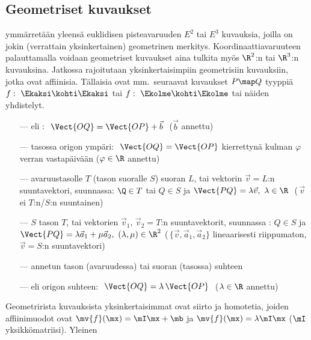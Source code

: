 \subsection{Geometriset kuvaukset}

 ymmärretään yleensä euklidisen pisteavaruuden $E^2$ tai $E^3$
kuvauksia, joilla on jokin (verrattain yksinkertainen) geometrinen merkitys. 
Koordinaattiavaruuteen palauttamalla voidaan geometriset kuvaukset aina tulkita myös $\R^2$:n 
tai $\R^3$:n kuvauksina. Jatkossa rajoitutaan yksinkertaisimpiin geometrisiin kuvauksiin,
jotka ovat affiinisia. Tällaisia ovat mm.\ seuraavat kuvaukset $P \map Q$ tyyppiä 
$f:\ \Ekaksi\kohti\Ekaksi$ tai $f:\ \Ekolme\kohti\Ekolme$ tai näiden yhdistelyt.
  
  
\begin{itemize}
\item[---]  eli : $\ \Vect{OQ} = \Vect{OP} + \vec{b}\ $ 
           ($\vec{b}$ annettu)
\item[---]  tasossa origon ympäri: $\ \Vect{OQ} = \Vect{OP}$ kierrettynä kulman 
            $\varphi$ verran vastapäivään ($\varphi \in \R$ annettu)
\item[---]  avaruustasolle $T$ (tason suoralle $S$) suoran $L$,
           tai vektorin $\vec v=L$:n suuntavektori, suunnassa: $\Q \in T$ tai $Q \in S$ ja
           $\Vect{PQ}=\lambda\vec v,\ \lambda\in\R\ $ ($\,\vec v\,$ ei $T$:n/$S$:n suuntainen)
\item[---]  $S$ tason $T$, tai vektorien
           $\vec v_1,\,\vec v_2=T$:n suuntavektorit, suunnassa : $Q \in S$ ja 
           $\Vect{PQ}=\lambda\vec{a}_1 + \mu\vec{a}_2,\ (\lambda,\mu)\in\R^2$
           ($\,\{\vec v,\vec{a}_1,\vec{a}_2\}$ lineaarisesti riippumaton, $\vec v=S$:n
           suuntavektori)
\item[---]  annetun tason (avaruudessa) tai suoran (tasossa) suhteen
\item[---]  eli  origon suhteen: 
           $\ \Vect{OQ} = \lambda\,\Vect{OP}\ $ ($\lambda \in \R$ annettu)
\end{itemize}
Geometrirista kuvauksista yksinkertaisimmat ovat siirto ja homotetia, joiden affiinimuodot ovat 
$\mv{f}(\mx) = \mI\mx + \mb$ ja $\mv{f}(\mx)=\lambda\mI\mx$ ($\mI$ yksikkömatriisi). Yleinen
